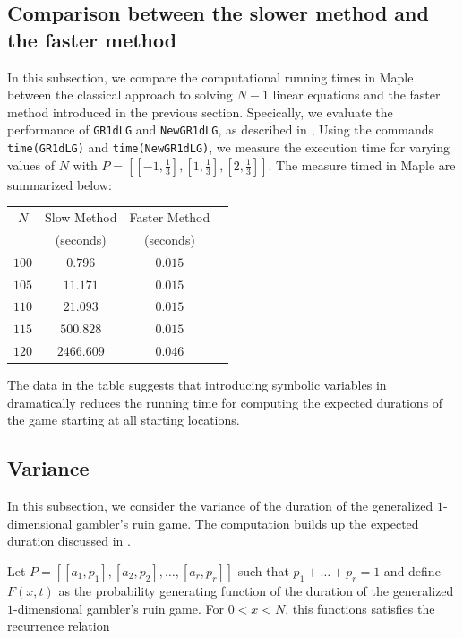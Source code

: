 \documentclass[reqno]{amsart}
\theoremstyle{definition}
\theoremstyle{definition}
\theoremstyle{remark}
\begin{document}
\subsection{Comparison between the slower method and the faster method}\label{subsec:time comparison in 1d}
In this subsection, we compare the computational running times in Maple between the classical approach to solving $N-1$ linear equations and the faster method introduced in the previous section. Specically, we evaluate the performance of \lstinline{GR1dLG} and \lstinline{NewGR1dLG}, as described in , Using the commands \lstinline{time(GR1dLG)} and \lstinline{time(NewGR1dLG)}, we measure the execution time for varying values of $N$ with $P=[[-1,\frac{1}{3}],[1,\frac{1}{3}],[2,\frac{1}{3}]]$. The measure timed in Maple are summarized below:
\begin{table}[H]
\centering
\begin{tabular}{|c|c|c|c|}
\hline
$N$ & Slow Method & Faster Method\\
&(seconds) & (seconds)\\
\hline
$100$ & $0.796$ & $0.015$ \\ \hline
$105$ & $11.171$ & $0.015$ \\ \hline
$110$ & $21.093$ & $0.015$ \\ \hline
$115$ & $500.828$ & $0.015$ \\ \hline
$120$ & $2466.609$ & $0.046$ \\
\hline
\end{tabular}
\end{table}

The data in the table suggests that introducing symbolic variables in  dramatically reduces the running time for computing the expected durations of the game starting at all starting locations.

\subsection{Variance} In this subsection, we consider the variance of the duration of the generalized $1$-dimensional gambler's ruin game. The computation builds up the expected duration discussed in . 

Let $P=[[a_1,p_1],[a_2,p_2],\ldots,[a_r,p_r]]$ such that $p_1+\ldots+p_r=1$ and define $F(x,t)$ as the probability generating function of the duration of the generalized $1$-dimensional gambler's ruin game. For $0<x<N$, this functions satisfies the recurrence relation
\end{document}
